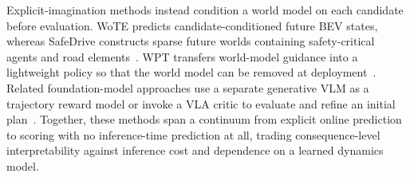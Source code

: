 Explicit-imagination methods instead condition a world model on each candidate before evaluation.
WoTE predicts candidate-conditioned future BEV states, whereas SafeDrive constructs sparse future worlds containing safety-critical agents and road elements~\cite{li2025wote,kim2026safedrive}.
WPT transfers world-model guidance into a lightweight policy so that the world model can be removed at deployment~\cite{jiang2026wpt}.
Related foundation-model approaches use a separate generative VLM as a trajectory reward model or invoke a VLA critic to evaluate and refine an initial plan~\cite{chen2026drivereward,yang2026criticvla}.
Together, these methods span a continuum from explicit online prediction to scoring with no inference-time prediction at all, trading consequence-level interpretability against inference cost and dependence on a learned dynamics model.
